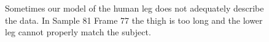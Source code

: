 \begin{figure}[bp]
	\centering
	\quad
	
	\caption{Sometimes our model of the human leg does not adequately describe the data.
		In Sample 81 Frame 77 the thigh is too long and the lower leg cannot properly match the subject.}
	\label{FittingErrors}
\end{figure}
